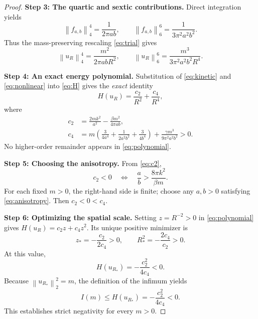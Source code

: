 \documentclass[11pt]{article}
\newcommand{\norm}[1]{\left\lVert #1\right\rVert}
\begin{document}
\begin{proof}
\medskip
\noindent\textbf{Step 3: The quartic and sextic contributions.}
Direct integration yields
\begin{equation}\label{eq:nonlinear-moments}
 \norm{f_{a,b}}_4^4=\frac{1}{2\pi ab},
 \qquad \norm{f_{a,b}}_6^6=\frac{1}{3\pi^2a^2b^2}.
\end{equation}
Thus the mass-preserving rescaling \eqref{eq:trial} gives
\begin{equation}\label{eq:nonlinear}
 \norm{u_R}_4^4=\frac{m^2}{2\pi abR^2},
 \qquad
 \norm{u_R}_6^6=\frac{m^3}{3\pi^2a^2b^2R^4}.
\end{equation}

\medskip
\noindent\textbf{Step 4: An exact energy polynomial.}
Substitution of \eqref{eq:kinetic} and \eqref{eq:nonlinear}
into \eqref{eq:H} gives the \emph{exact} identity
\begin{equation}\label{eq:polynomial}
 \boxed{H(u_R)=\frac{c_2}{R^2}+\frac{c_4}{R^4},}
\end{equation}
where
\begin{align}\label{eq:c2}
 c_2&=\frac{2mk^2}{a^2}-\frac{\beta m^2}{4\pi ab},\\
 c_4&=m\left(\frac{3}{4a^4}+\frac{1}{2a^2b^2}
 +\frac{3}{4b^4}\right)
 +\frac{\gamma m^3}{9\pi^2a^2b^2}>0.\label{eq:c4}
\end{align}
No higher-order remainder appears in \eqref{eq:polynomial}.

\medskip
\noindent\textbf{Step 5: Choosing the anisotropy.}
From \eqref{eq:c2},
\begin{equation}\label{eq:anisotropy}
 c_2<0
 \quad\Longleftrightarrow\quad
 \frac{a}{b}>\frac{8\pi k^2}{\beta m}.
\end{equation}
For each fixed $m>0$, the right-hand side is finite;
choose any $a,b>0$ satisfying \eqref{eq:anisotropy}.
Then $c_2<0<c_4$.

\medskip
\noindent\textbf{Step 6: Optimizing the spatial scale.}
Setting $z=R^{-2}>0$ in \eqref{eq:polynomial} gives
$H(u_R)=c_2z+c_4z^2$.
Its unique positive minimizer is
\begin{equation}\label{eq:Ropt}
 z_*=-\frac{c_2}{2c_4}>0,
 \qquad R_*^2=-\frac{2c_4}{c_2}>0.
\end{equation}
At this value,
\begin{equation}\label{eq:negative-trial}
 H(u_{R_*})=-\frac{c_2^2}{4c_4}<0.
\end{equation}
Because $\norm{u_{R_*}}_2^2=m$, the definition of the infimum yields
\begin{equation}\label{eq:upper}
 I(m)\le H(u_{R_*})=-\frac{c_2^2}{4c_4}<0.
\end{equation}
This establishes strict negativity for every $m>0$.


\end{proof}
\end{document}
